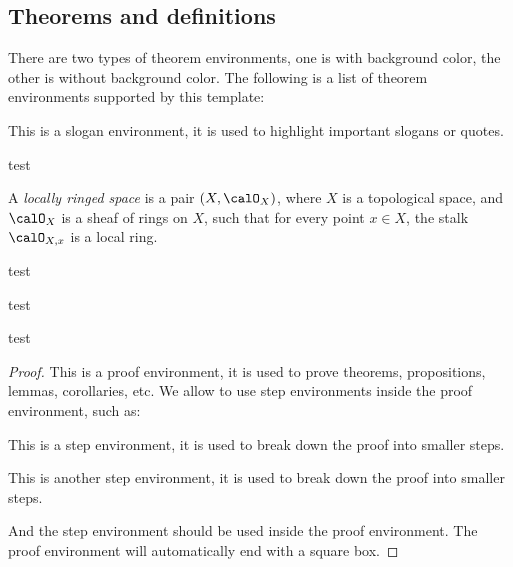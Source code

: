 \subsection{Theorems and definitions}\label{subsec:theorems_and_definitions}
    
    There are two types of theorem environments, one is with background color, the other is without background color. 
    The following is a list of theorem environments supported by this template:
    
    \begin{slogan}
        This is a slogan environment, it is used to highlight important slogans or quotes.
    \end{slogan}

    \begin{mainthm}
        test
    \end{mainthm}

    \begin{definition}
        A \emph{locally ringed space} is a pair \((X, \calO_X)\), where \(X\) is a topological space, and \(\calO_X\) is a sheaf of rings on \(X\), such that for every point \(x \in X\), the stalk \(\calO_{X,x}\) is a local ring.
    \end{definition}

    \begin{construction}
        test
    \end{construction}

    \begin{notation}
        test
    \end{notation}

    \begin{proposition}
        test 
    \end{proposition}
    \begin{proof}
        This is a proof environment, it is used to prove theorems, propositions, lemmas, corollaries, etc.
        We allow to use step environments inside the proof environment, such as:
        \begin{step}\label{step:1_in_proof_1}
            This is a step environment, it is used to break down the proof into smaller steps.
        \end{step}
        \begin{step}\label{step:2_in_proof_1}
            This is another step environment, it is used to break down the proof into smaller steps.
        \end{step}
        And the step environment should be used inside the proof environment.
        The proof environment will automatically end with a square box.
    \end{proof}
    
